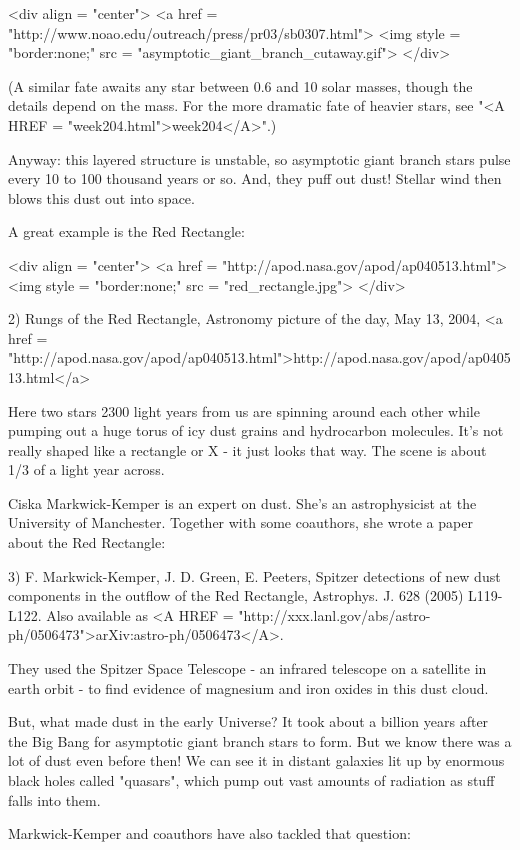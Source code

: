 <div align = "center">
<a href = "http://www.noao.edu/outreach/press/pr03/sb0307.html">
<img style = "border:none;" src = "asymptotic_giant_branch_cutaway.gif">
</div>

(A similar fate awaits any star between 0.6 and 10 solar masses,
though the details depend on the mass.  For the more dramatic
fate of heavier stars, see "<A HREF = "week204.html">week204</A>".)

Anyway: this layered structure is unstable, so asymptotic giant branch 
stars pulse every 10 to 100 thousand years or so.  And, they 
puff out dust!  Stellar wind then blows this dust out into space.  

A great example is the Red Rectangle:

<div align = "center">
<a href = "http://apod.nasa.gov/apod/ap040513.html">
<img style = "border:none;" src = "red_rectangle.jpg">
</div>

2) Rungs of the Red Rectangle, Astronomy picture of the day, 
May 13, 2004, <a href = "http://apod.nasa.gov/apod/ap040513.html">http://apod.nasa.gov/apod/ap040513.html</a>

Here two stars 2300 light years from us are spinning around
each other while pumping out a huge torus of icy dust grains and
hydrocarbon molecules.  It's not really shaped like a rectangle 
or X - it just looks that way.  The scene is about 1/3 of a light 
year across.

Ciska Markwick-Kemper is an expert on dust.  She's an astrophysicist
at the University of Manchester.  Together with some coauthors, she
wrote a paper about the Red Rectangle:

3) F. Markwick-Kemper, J. D. Green, E. Peeters, Spitzer 
detections of new dust components in the outflow of the Red 
Rectangle, Astrophys. J. 628 (2005) L119-L122.  Also available
as <A HREF = "http://xxx.lanl.gov/abs/astro-ph/0506473">arXiv:astro-ph/0506473</A>.

They used the Spitzer Space Telescope - an infrared telescope on 
a satellite in earth orbit - to find evidence of magnesium and 
iron oxides in this dust cloud.  

But, what made dust in the early Universe?   It took about a
billion years after the Big Bang for asymptotic giant branch stars
to form.  But we know there was a lot of dust even before then!
We can see it in distant galaxies lit up by enormous black holes 
called "quasars", which pump out vast amounts of radiation as 
stuff falls into them.  

Markwick-Kemper and coauthors have also tackled that question:


